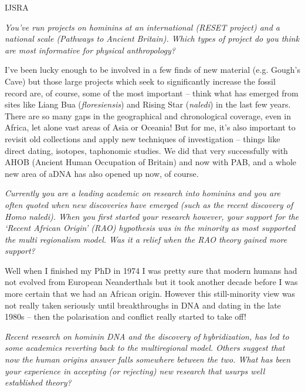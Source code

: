 \documentclass{ijsra}
\begin{document}
\begin{labeling}{IJSRA}
\item[IJSRA]
\emph{You’ve run projects on hominins at an international (RESET project) and a national scale (Pathways to Ancient Britain).
Which types of project do you think are most informative for physical anthropology?}

\item[CS]
I’ve been lucky enough to be involved in a few finds of new material (e.g. Gough’s Cave) but
those large projects which seek to significantly increase the fossil record are, of course,
some of the most important – think what has emerged from sites like Liang Bua (\emph{floresiensis}) and Rising Star (\emph{naledi})
in the last few years. 
There are so many gaps in the geographical and chronological coverage, even in Africa, let alone vast areas of Asia or Oceania!
But for me, it’s also important to revisit old collections and apply new techniques of investigation – things like direct dating,
isotopes, taphonomic studies. 
We did that very successfully with AHOB (Ancient Human Occupation of Britain) and now with PAB,
and a whole new area of aDNA has also opened up now, of course.

\item[IJSRA]
\emph{Currently you are a leading academic on research into hominins and you are often quoted when new discoveries
have emerged (such as the recent discovery of \textup{Homo naledi}). When you first started your research however,
your support for the ‘Recent African Origin’ (RAO) hypothesis was in the minority as most supported the multi regionalism model.
Was it a relief when the RAO theory gained more support?}

\item[CS]
Well when I finished my PhD in 1974 I was pretty sure that modern humans had not evolved from European Neanderthals but
it took another decade before I was more certain that we had an African origin.
However this still-minority view was not really taken seriously until breakthroughs in DNA and dating in the late
1980s – then the polarisation and conflict really started to take off!

\item[IJSRA]
\emph{Recent research on hominin DNA and the discovery of hybridization, has led to some academics reverting back to
the multiregional model. 
Others suggest that now the human origins answer falls somewhere between the two.
What has been your experience in accepting (or rejecting) new research that usurps well established theory?}


\end{labeling}
\end{document}
